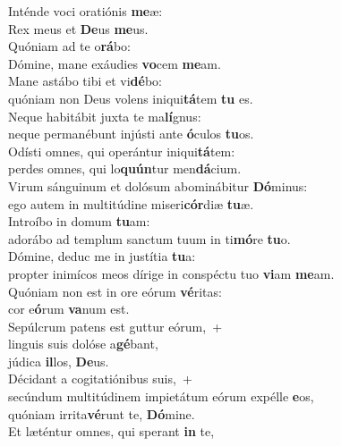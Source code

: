 \evenverse Inténde voci oratiónis \textbf{me}æ:~\*\\
\evenverse Rex meus et \textbf{De}us \textbf{me}us.\\
\oddverse Quóniam ad te o\textbf{rá}bo:~\*\\
\oddverse Dómine, mane exáudies \textbf{vo}cem \textbf{me}am.\\
\evenverse Mane astábo tibi et vi\textbf{dé}bo:~\*\\
\evenverse quóniam non Deus volens iniqui\textbf{tá}tem \textbf{tu} es.\\
\oddverse Neque habitábit juxta te ma\textbf{lí}gnus:~\*\\
\oddverse neque permanébunt injústi ante \textbf{ó}culos \textbf{tu}os.\\
\evenverse Odísti omnes, qui operántur iniqui\textbf{tá}tem:~\*\\
\evenverse perdes omnes, qui lo\textbf{quún}tur men\textbf{dá}cium.\\
\oddverse Virum sánguinum et dolósum abominábitur \textbf{Dó}minus:~\*\\
\oddverse ego autem in multitúdine miseri\textbf{cór}diæ \textbf{tu}æ.\\
\evenverse Introíbo in domum \textbf{tu}am:~\*\\
\evenverse adorábo ad templum sanctum tuum in ti\textbf{mó}re \textbf{tu}o.\\
\oddverse Dómine, deduc me in justítia \textbf{tu}a:~\*\\
\oddverse propter inimícos meos dírige in conspéctu tuo \textbf{vi}am \textbf{me}am.\\
\evenverse Quóniam non est in ore eórum \textbf{vé}ritas:~\*\\
\evenverse cor e\textbf{ó}rum \textbf{va}num est.\\
\oddverse Sepúlcrum patens est guttur eórum,~+\\
\oddverse  linguis suis dolóse a\textbf{gé}bant,~\*\\
\oddverse júdica \textbf{il}los, \textbf{De}us.\\
\evenverse Décidant a cogitatiónibus suis,~+\\
\evenverse  secúndum multitúdinem impietátum eórum expélle \textbf{e}os,~\*\\
\evenverse quóniam irrita\textbf{vé}runt te, \textbf{Dó}mine.\\
\oddverse Et læténtur omnes, qui sperant \textbf{in} te,~\*\\
